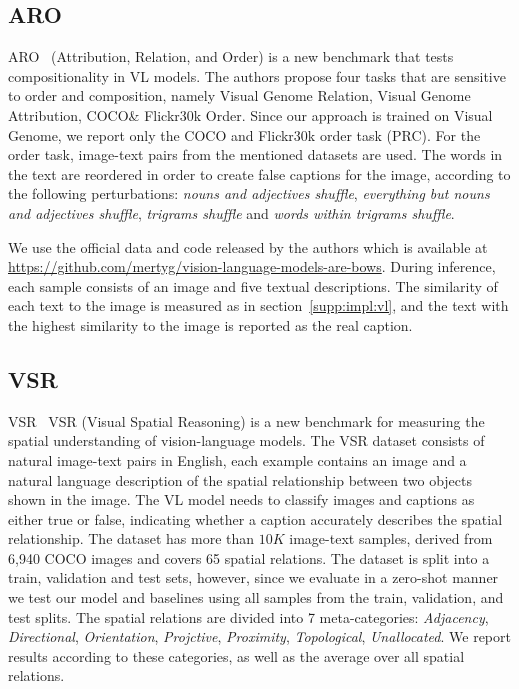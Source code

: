 \documentclass[11pt]{article}
\def\secref#1{section~\ref{#1}}
\newcommand{\minisection}[1]{\noindent{\textbf{#1}.}}
\begin{document}
\subsection{ARO}
\label{supp:impl:aro}
\minisection{Dataset} ARO~\cite{yuksekgonul2023when} (Attribution, Relation, and Order) is a new benchmark that tests compositionality in VL models.
The authors propose four tasks that are sensitive to order and composition, namely Visual Genome Relation, Visual Genome Attribution, COCO\& Flickr30k Order. Since our approach is trained on Visual Genome, we report only the COCO and Flickr30k order task (PRC). For the order task, image-text pairs from the mentioned datasets are used. The words in the text are reordered in order to create false captions for the image, according to the following perturbations: \emph{nouns and adjectives shuffle}, \emph{everything but nouns and adjectives shuffle},  \emph{trigrams shuffle} and \emph{words within trigrams shuffle}.


\minisection{Inference details} We use the official data and code released by the authors which is available at \url{https://github.com/mertyg/vision-language-models-are-bows}. 
During inference, each sample consists of an image and five textual descriptions. The similarity of each text to the image is measured as in \secref{supp:impl:vl}, and the text with the highest similarity to the image is reported as the real caption.



\subsection{VSR}
\label{supp:impl:vsr}
\minisection{Dataset} VSR~\cite{Liu2022VisualSR} VSR (Visual Spatial Reasoning) is a new benchmark for measuring the spatial understanding of vision-language models. The VSR dataset consists of natural image-text pairs in English, each example contains an image and a natural language description of the spatial relationship between two objects shown in the image. The VL model needs to classify images and captions as either true or false, indicating whether a caption accurately describes the spatial relationship. The dataset has more than $10K$ image-text samples,  derived from 6,940 COCO images and covers 65 spatial relations. The dataset is split into a train, validation and test sets, however, since we evaluate in a zero-shot manner we test our model and baselines using all samples from the train, validation, and test splits. The spatial relations are divided into 7 meta-categories: \emph{Adjacency}, \emph{Directional}, \emph{Orientation}, \emph{Projctive}, \emph{Proximity}, \emph{Topological}, \emph{Unallocated}. We report results according to these categories, as well as the average over all spatial relations. 
\end{document}
